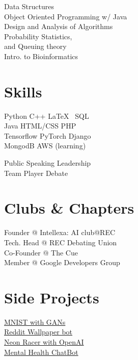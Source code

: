 \documentclass[]{deedy-resume-openfont}
\begin{document}
\begin{minipage}[t]{0.33\textwidth}
    Data Structures \\
    Object Oriented Programming w/ Java \\
    Design and Analysis of Algorithms \\
    Probability Statistics,  \\ 
    and Queuing theory \\
    Intro. to Bioinformatics \\
    
    
    
    
    \section{Skills}
    Python \textbullet{}   C++ \textbullet{} \LaTeX\ \textbullet{} SQL  \\ 
    Java \textbullet{} HTML/CSS \textbullet{}  PHP \\
    Tensorflow \textbullet{} PyTorch \textbullet{} Django \\ \textbullet{} MongodB \textbullet{} AWS (learning) \\
    \sectionsep
    
    \textbullet{} Public Speaking  \textbullet{} Leadership \\  \textbullet{} Team Player \textbullet{} Debate  
    \sectionsep
    
    \section{Clubs \& Chapters}
    
    Founder @ Intellexa: AI club@REC \\
    Tech. Head @ REC Debating Union \\
    Co-Founder @ The Cue \\
    Member @ Google Developers Group \\
    
    \sectionsep
    \section{Side Projects}{
   
    \href{https://www.github.com/tarunn2799/mnist-gans-tf}{MNIST with GANs} \\
    \href{https://www.github.com/tarunn2799/reddit-wallpaper-bot}{Reddit Wallpaper bot}     \\
    \href{https://www.github.com/tarunn2799/Neon-Racer-with-OpenAI}{Neon Racer with OpenAI} \\
    \href{https://www.github.com/tarunn2799/chatbot-mentalhealth}{Mental Health ChatBot} \\
    
}
\end{minipage}
\end{document}
